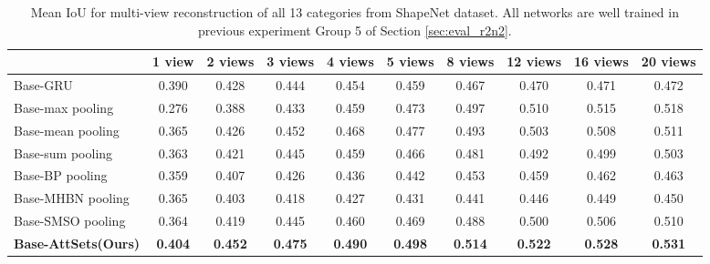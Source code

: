 \documentclass[twocolumn]{svjour3}    \pdfoutput=1
\newcommand{\nickname}{AttSets}
\begin{document}
\begin{table*}[ht]
\caption{Mean IoU for multi-view reconstruction of all 13 categories from ShapeNet dataset. All networks are well trained in previous experiment Group 5 of Section \ref{sec:eval_r2n2}.}
\centering
\label{tab:iou_lsm_allv}
\tabcolsep=0.2cm
\begin{tabular}{ l|ccccccccc}
\hline
&1 view&2 views&3 views& 4 views&5 views&8 views&12 views&16 views&20 views \\
\hline
Base-GRU &0.390&0.428&0.444&0.454&0.459&0.467&0.470&0.471&0.472 \\
Base-max pooling &0.276&0.388&0.433&0.459&0.473&0.497&0.510&0.515&0.518 \\
Base-mean pooling &0.365&0.426&0.452&0.468&0.477&0.493&0.503&0.508&0.511 \\
Base-sum pooling &0.363&0.421&0.445&0.459&0.466&0.481&0.492&0.499&0.503 \\
Base-BP pooling &0.359&0.407&0.426&0.436&0.442&0.453&0.459&0.462&0.463 \\
Base-MHBN pooling &0.365&0.403&0.418&0.427&0.431&0.441&0.446&0.449&0.450 \\
Base-SMSO pooling &0.364&0.419&0.445&0.460&0.469&0.488&0.500&0.506&0.510 \\
\textbf{Base-\nickname{}(Ours)} &\textbf{0.404}&\textbf{0.452}&\textbf{0.475}&\textbf{0.490}&\textbf{0.498}&\textbf{0.514}
&\textbf{0.522}&\textbf{0.528}&\textbf{0.531} \\
\hline
\end{tabular}
\vspace{-0.3 cm}
\end{table*}
\end{document}
